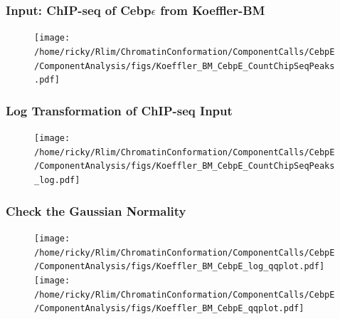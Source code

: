 \documentclass[notes]{beamer}
\begin{document}
\begin{frame}
    \frametitle{Input: ChIP-seq of Cebp$\epsilon$ from Koeffler-BM}
    \begin{figure}
        \texttt{[image: /home/ricky/Rlim/ChromatinConformation/ComponentCalls/CebpE/ComponentAnalysis/figs/Koeffler\_BM\_CebpE\_CountChipSeqPeaks.pdf]}
    \end{figure}
\end{frame}

\begin{frame}                                                                                                                        
    \frametitle{Log Transformation of ChIP-seq Input}
    \begin{figure}
        \texttt{[image: /home/ricky/Rlim/ChromatinConformation/ComponentCalls/CebpE/ComponentAnalysis/figs/Koeffler\_BM\_CebpE\_CountChipSeqPeaks\_log.pdf]}
    \end{figure}
\end{frame}

\begin{frame}                                                                                                                        
    \frametitle{Check the Gaussian Normality}
    \begin{figure}
        \texttt{[image: /home/ricky/Rlim/ChromatinConformation/ComponentCalls/CebpE/ComponentAnalysis/figs/Koeffler\_BM\_CebpE\_log\_qqplot.pdf]}
        \texttt{[image: /home/ricky/Rlim/ChromatinConformation/ComponentCalls/CebpE/ComponentAnalysis/figs/Koeffler\_BM\_CebpE\_qqplot.pdf]}
    \end{figure}
\end{frame}
\end{document}
